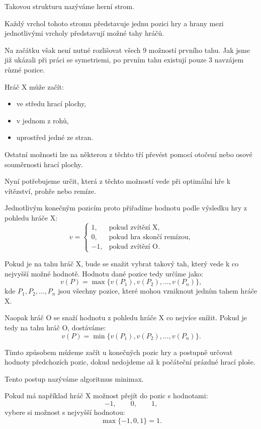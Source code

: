 \documentclass[12pt,a4paper]{article}
\begin{document}
Takovou strukturu nazýváme herní strom.

Každý vrchol tohoto stromu představuje jednu pozici hry 
a hrany mezi jednotlivými vrcholy představují možné tahy hráčů.

Na začátku však není nutné rozlišovat všech 9 možností prvního tahu.
Jak jsme již ukázali při práci se symetriemi, 
po prvním tahu existují pouze 3 navzájem různé pozice.

Hráč $\mathrm{X}$ může začít:
\begin{itemize}
    \item ve středu hrací plochy,
    \item v jednom z rohů,
    \item uprostřed jedné ze stran.
\end{itemize}

Ostatní možnosti lze na některou z těchto tří převést pomocí otočení 
nebo osové souměrnosti hrací plochy.

Nyní potřebujeme určit, která z těchto možností vede při optimální hře k vítězství, 
prohře nebo remíze.

Jednotlivým konečným pozicím proto přiřadíme hodnotu podle výsledku hry 
z pohledu hráče $\mathrm{X}$:
\[
    v=
    \begin{cases}
        1, & \text{pokud zvítězí } \mathrm{X},\\
        0, & \text{pokud hra skončí remízou},\\
        -1, & \text{pokud zvítězí } \mathrm{O}.
    \end{cases}
\]

Pokud je na tahu hráč $\mathrm{X}$, bude se snažit vybrat takový tah, 
který vede k co nejvyšší možné hodnotě. Hodnotu dané pozice tedy určíme jako:
\[
    v(P)=\max\{v(P_1),v(P_2),\ldots,v(P_n)\},
\]
kde $P_1,P_2,\ldots,P_n$ jsou všechny pozice, 
které mohou vzniknout jedním tahem hráče $\mathrm{X}$.

Naopak hráč $\mathrm{O}$ se snaží hodnotu z pohledu hráče $\mathrm{X}$ co nejvíce snížit. 
Pokud je tedy na tahu hráč $\mathrm{O}$, dostáváme:
\[
    v(P)=\min\{v(P_1),v(P_2),\ldots,v(P_n)\}.
\]

Tímto způsobem můžeme začít u konečných pozic hry a postupně určovat hodnoty předchozích pozic,
dokud nedojdeme až k počáteční prázdné hrací ploše.

Tento postup nazýváme algoritmus minimax.

Pokud má například hráč $\mathrm{X}$ možnost přejít do pozic s hodnotami:
\[
    -1,\qquad 0,\qquad 1,
\]
vybere si možnost s nejvyšší hodnotou:
\[
    \max\{-1,0,1\}=1.
\]
\end{document}
